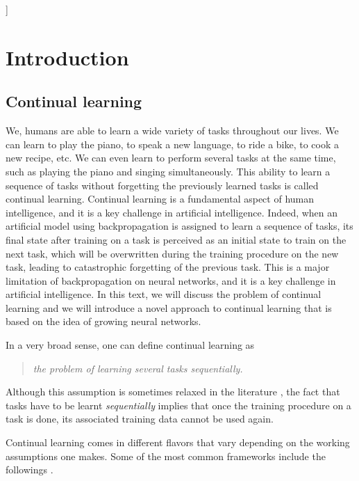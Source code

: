 \documentclass[11pt]{article}
\begin{document}
\tableofcontents]



\clearpage



\section{Introduction}



\subsection{Continual learning}


We, humans are able to learn a wide variety of tasks throughout our lives. We can learn to play the piano, to speak a new language, to ride a bike, to cook a new recipe, etc. We can even learn to perform several tasks at the same time, such as playing the piano and singing simultaneously. This ability to learn a sequence of tasks without forgetting the previously learned tasks is called continual learning. Continual learning is a fundamental aspect of human intelligence, and it is a key challenge in artificial intelligence. Indeed, when an artificial model using backpropagation is assigned to learn a sequence of tasks, its final state after training on a task is perceived as an initial state to train on the next task, which will be overwritten during the training procedure on the new task, leading to catastrophic forgetting of the previous task. This is a major limitation of backpropagation on neural networks, and it is a key challenge in artificial intelligence. In this text, we will discuss the problem of continual learning and we will introduce a novel approach to continual learning that is based on the idea of growing neural networks.

\vspace{2mm}
\noindent
In a very broad sense, one can define continual learning as

\begin{quote}
    \itshape
    \centering
    the problem of learning several tasks sequentially.
\end{quote}
Although this assumption is sometimes relaxed in the literature \cite{replay_3}, the fact that tasks have to be learnt \textit{sequentially} implies that once the training procedure on a task is done, its associated training data cannot be used again. 

\vspace{2mm}
\noindent
Continual learning comes in different flavors that vary depending on the working assumptions one makes. Some of the most common frameworks include the followings \cite{frameworks_1}\cite{EWC_7_frameworks_2}.
\end{document}
